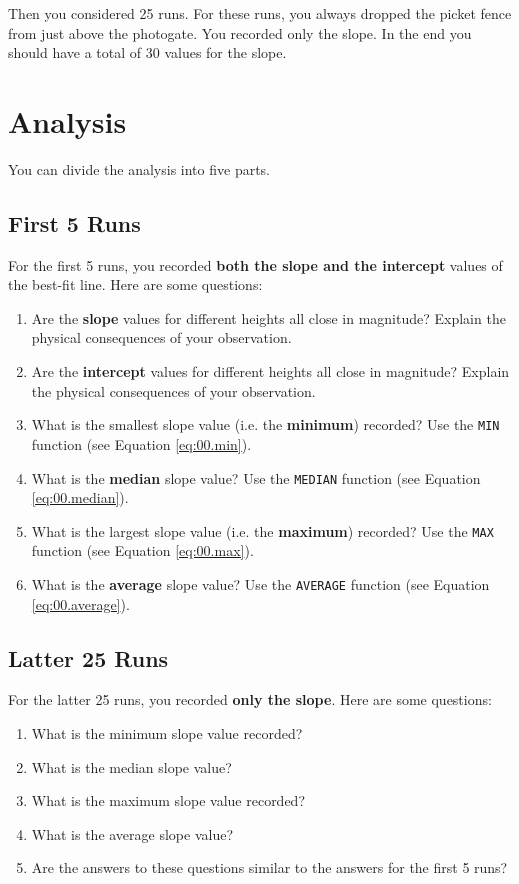 Then you considered 25 runs. For these runs, you always dropped the picket fence from just above the photogate. You recorded only the slope. In the end you should have a total of 30 values for the slope.
\section{Analysis}
You can divide the analysis into five parts.
\subsection{First 5 Runs} \label{sec:01.first.5}
For the first 5 runs, you recorded \textbf{both the slope and the intercept} values of the best-fit line. Here are some questions:
\begin{enumerate}
    \item Are the \textbf{slope} values for different heights all close in magnitude? Explain the physical consequences of your observation.
    \item Are the \textbf{intercept} values for different heights all close in magnitude? Explain the physical consequences of your observation.
    \item What is the smallest slope value (i.e. the \textbf{minimum}) recorded? Use the \texttt{MIN} function (see Equation \ref{eq:00.min}).
    \item What is the \textbf{median} slope value? Use the \texttt{MEDIAN} function (see Equation \ref{eq:00.median}).
    \item What is the largest slope value (i.e. the \textbf{maximum}) recorded? Use the \texttt{MAX} function (see Equation \ref{eq:00.max}).
    \item What is the \textbf{average} slope value? Use the \texttt{AVERAGE} function (see Equation \ref{eq:00.average}).
\end{enumerate}
\subsection{Latter 25 Runs} \label{sec:01.latter.25}
For the latter 25 runs, you recorded \textbf{only the slope}. Here are some questions:
\begin{enumerate}
    \item What is the minimum slope value recorded?
    \item What is the median slope value?
    \item What is the maximum slope value recorded?
    \item What is the average slope value?
    \item Are the answers to these questions similar to the answers for the first 5 runs?
\end{enumerate}
